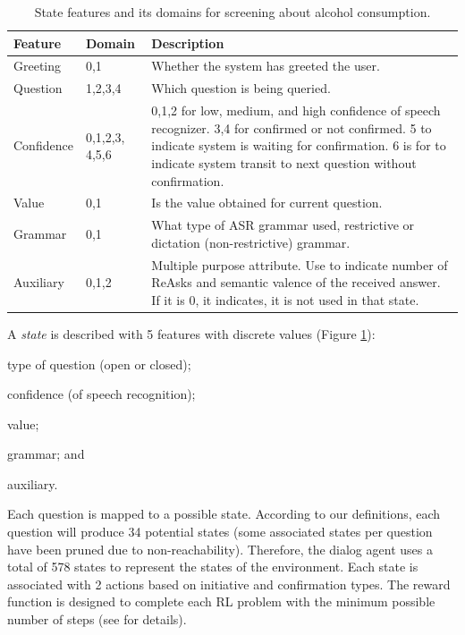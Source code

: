 \documentclass[letterpaper]{article}
\begin{document}
\begin{table}[!ht]
\caption{State features and its domains for screening about alcohol consumption.}
\label{FeaturesRepresentation}
\begin{tabular}{ | p{14mm} | p{11mm} | p{48mm} | } \hline
    \textbf{Feature} & \textbf{Domain} & \textbf{Description} \\ \hline
    Greeting   & 0,1              & Whether the system has greeted the user. \\ \hline
    Question   & 1,2,3,4          & Which question is being queried.\\ \hline
    Confidence & 0,1,2,3, 4,5,6 & 0,1,2 for low, medium, and high confidence of speech recognizer. 3,4 for
                                  confirmed or not confirmed. 5 to indicate system is waiting for confirmation. 
                                  6 is for to indicate system transit to next question without confirmation.\\ \hline
    Value      & 0,1            & Is the value obtained for current question.\\ \hline
    Grammar    & 0,1            & What type of ASR grammar used, restrictive or dictation (non-restrictive) 
                                  grammar.  \\ \hline
    Auxiliary  & 0,1,2          & Multiple purpose attribute. Use to indicate number of ReAsks and semantic 
                                  valence of the received answer. If it is 0, it indicates, it is not used in 
                                  that state.  \\ \hline
\end{tabular}
\end{table}


A {\em state} is described with 5 features with discrete values (Figure 
\ref{FeaturesRepresentation}): \begin{inparaenum}[1)] \item type of question (open or closed); 
\item confidence (of speech recognition); \item value; \item grammar; and \item auxiliary. \end{inparaenum} Each 
question is mapped to a possible state. According to our definitions, each question will produce 34 
potential states (some associated states per question have been pruned due to non-reachability). 
Therefore, the dialog agent uses a total of 578 states to represent the states of the environment. Each 
state is associated with 2 actions based on initiative and  confirmation types. The reward 
function is designed to complete each RL problem with the minimum possible number of steps (see \cite{YASCLL14} for details).  
\end{document}
